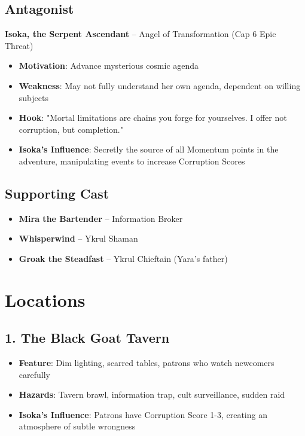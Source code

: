 \documentclass[11pt]{article}
\begin{document}
\subsection{Antagonist}

\textbf{Isoka, the Serpent Ascendant} – Angel of Transformation (Cap 6 Epic Threat)
\begin{itemize}[leftmargin=*]
    \item \textbf{Motivation}: Advance mysterious cosmic agenda
    \item \textbf{Weakness}: May not fully understand her own agenda, dependent on willing subjects
    \item \textbf{Hook}: "Mortal limitations are chains you forge for yourselves. I offer not corruption, but completion."
    \item \textbf{Isoka's Influence}: Secretly the source of all Momentum points in the adventure, manipulating events to increase Corruption Scores
\end{itemize}

\subsection{Supporting Cast}

\begin{itemize}[leftmargin=*]
    \item \textbf{Mira the Bartender} – Information Broker
    \item \textbf{Whisperwind} – Ykrul Shaman
    \item \textbf{Groak the Steadfast} – Ykrul Chieftain (Yara's father)
\end{itemize}

\newpage

\section{Locations}

\subsection{1. The Black Goat Tavern}
\begin{itemize}[leftmargin=*]
    \item \textbf{Feature}: Dim lighting, scarred tables, patrons who watch newcomers carefully
    \item \textbf{Hazards}: Tavern brawl, information trap, cult surveillance, sudden raid
    \item \textbf{Isoka's Influence}: Patrons have Corruption Score 1-3, creating an atmosphere of subtle wrongness
\end{itemize}
\end{document}
